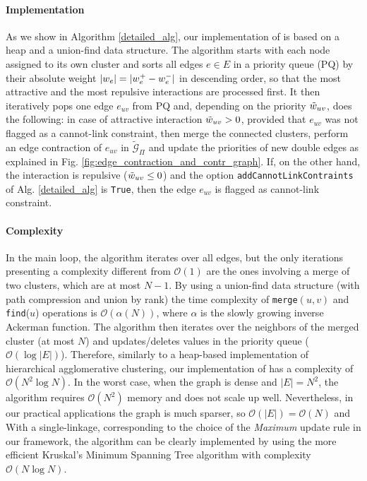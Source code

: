 \paragraph{Implementation} As we show in Algorithm \ref{detailed_alg}, our implementation of \algname{} is based on a heap and a union-find data structure. The algorithm starts with each node assigned to its own cluster and sorts all edges $e\in E$ in a priority queue (PQ) by their absolute weight $|w_e|=|w_e^+ - w_e^-|$ in descending order, so that the most attractive and the most repulsive interactions are processed first. It then iteratively pops one edge $e_{uv}$ from PQ and, depending on the priority $\tilde{w}_{uv}$, does the following: in case of attractive interaction $\tilde{w}_{uv}>0$, provided that $e_{uv}$ was not flagged as a cannot-link constraint, then merge the connected clusters, perform an edge contraction of $e_{uv}$ in $\tilde{\mathcal{G}}_\Pi$ and update the priorities of new double edges as explained in Fig. \ref{fig:edge_contraction_and_contr_graph}. 
If, on the other hand, the interaction is repulsive ($\tilde{w}_{uv}\leq 0$) and the option \texttt{addCannotLinkContraints} of Alg. \ref{detailed_alg} is \texttt{True}, then the edge $e_{uv}$ is flagged as cannot-link constraint.

\paragraph*{Complexity} In the main loop, the algorithm iterates over all edges, but the only iterations presenting a complexity different from $\mathcal{O}(1)$ are the ones involving a merge of two clusters, which are at most $N-1$. By using a union-find data structure (with path compression and union by rank) the time complexity of \texttt{merge}$(u, v)$ and \texttt{find}($u$) operations is $\mathcal{O}(\alpha(N))$, where $\alpha$ is the slowly growing inverse Ackerman function. The algorithm then iterates over the neighbors of the merged cluster (at most $N$) and updates/deletes values in the priority queue ($\mathcal{O}(\log |E|)$). Therefore, similarly to a heap-based implementation of hierarchical agglomerative clustering, our implementation of \algname{} has a complexity of $\mathcal{O}(N^2 \log N)$. In the worst case, when the graph is dense and $|E|=N^2$, the algorithm requires $\mathcal{O}(N^2)$ memory and does not scale up well. Nevertheless, in our practical applications the graph is much sparser, so $\mathcal{O}(|E|)=\mathcal{O}(N)$ and  With a single-linkage, corresponding to the choice of the \emph{Maximum} update rule in our framework, the algorithm can be clearly implemented by using the more efficient Kruskal's Minimum Spanning Tree algorithm with complexity $\mathcal{O}(N \log N)$. 

